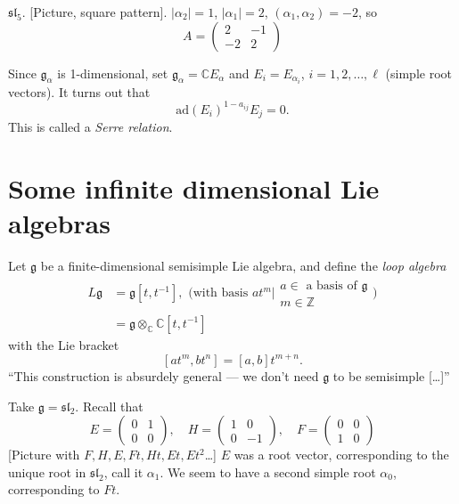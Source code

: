 \begin{example}
\label{example-Cartan-matrix-sl5}
$\mathfrak{sl}_5$. [Picture, square pattern]. $|\alpha_2|=1$, $|\alpha_1|=2$,
$(\alpha_1,\alpha_2)=-2$, so
$$
A=\begin{pmatrix}
2&-1\\ 
-2&2
\end{pmatrix}
$$
\end{example}

\begin{remark}
\label{remark-}
Since $\mathfrak{g}_\alpha$ is 1-dimensional, set
$\mathfrak{g}_\alpha=\mathbb{C}E_\alpha$ and 
$E_i=E_{\alpha_i}$, $i=1,2,\ldots,\ell$ (simple root vectors). 
It turns out that 
$$
\text{ad}(E_i)^{1-a_{ij}}E_j=0.
$$
This is called a {\it Serre relation}.
\end{remark}

\section{Some infinite dimensional Lie algebras}
\label{section-some-infinite-dimensional-Lie-algebras}
Let $\mathfrak{g}$ be a finite-dimensional semisimple Lie algebra, and define
the {\it loop algebra} 
\begin{align*}
L\mathfrak{g}&=\mathfrak{g}[t,t^{-1}],\text{ (with basis 
$at^m|\substack{\text{$a \in $ a basis of $\mathfrak{g}$} \\ m \in \mathbb{Z}}$
)}\\
&=\mathfrak{g} \otimes _{\mathbb{C}}\mathbb{C}[t,t^{-1}]
\end{align*}
with the Lie bracket
$$
[at^m,bt^n]=[a,b]t^{m+n}.
$$
``This construction is absurdely general --- we don't need $\mathfrak{g}$ to be
semisimple […]''

\medskip\noindent
Take $\mathfrak{g}=\mathfrak{sl}_2$. Recall that
$$
E=\begin{pmatrix}
0&1\\ 
0&0
\end{pmatrix},\quad 
H=\begin{pmatrix}
1&0\\ 
0&-1
\end{pmatrix},\quad 
F=\begin{pmatrix}
0&0\\ 
1&0
\end{pmatrix}
$$
[Picture with $F,H,E,Ft,Ht,Et,Et^2$…]
$E$ was a root vector, corresponding to the unique root in $\mathfrak{sl}_2$,
call it $\alpha_1$. We seem to have a second simple root $\alpha_0$,
 corresponding to $Ft$.

